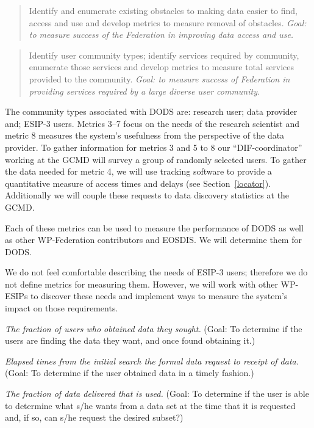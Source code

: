 \documentclass[12pt]{article}
\begin{document}
\begin{quote}
  Identify and enumerate existing obstacles to making data easier to find,
  access and use and develop metrics to measure removal of obstacles.
  \emph{Goal: to measure success of the Federation in improving data access
    and use.}
\end{quote}

\begin{quote}
Identify user community types; identify services required by community, 
enumerate those services and develop metrics to measure total services 
provided to the community. \emph{Goal: to measure success of Federation 
in providing services required by a large diverse user community.}
\end{quote}

The community types associated with DODS are: research user;
data provider and; ESIP-3 users. Metrics 3--7 focus on the needs of the
research scientist and metric 8 measures the system's usefulness from the
perspective of the data provider.  To gather information for metrics 3 and
5 to 8 our ``DIF-coordinator'' working at the GCMD will survey a
group of randomly selected users. To gather the data needed for metric 4, we
will use tracking software to provide a quantitative measure of access times
and delays (see Section~\ref{locator}).  Additionally we will couple these
requests to data discovery statistics at the GCMD. 

Each of these metrics can be used to measure the performance of \ac{DODS}
as well as other WP-Federation contributors and \acs{EOSDIS}. We will
determine them for \ac{DODS}.

We do not feel comfortable describing the needs of ESIP-3 users; therefore we
do not define metrics for measuring them. However, we will work with other
WP-ESIPs to discover these needs and implement ways to measure the
system's impact on those requirements.

\bigskip
{} \emph{The fraction of users who obtained 
data they sought.} (Goal: To determine if the users are finding the 
data they want, and once found obtaining it.)

\medskip
{} \emph{Elapsed times from the initial search 
the formal data request to receipt of data.} (Goal: To determine if the
user obtained data in a timely fashion.)

\medskip
{} \emph{The fraction of data delivered that is 
used.} (Goal: To determine if the user is able to determine what s/he wants
from a data set at the time that it is requested and, if so, can s/he
request the desired subset?)
\end{document}
